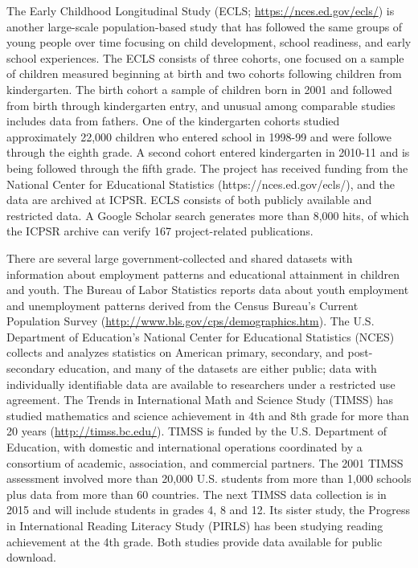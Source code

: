 \documentclass[letterpaper,man,apacite]{apa6}
\begin{document}
The Early Childhood Longitudinal Study (ECLS; \url{https://nces.ed.gov/ecls/}) is another large-scale population-based study that has followed the same groups of young people over time focusing on child development, school readiness, and early school experiences. 
The ECLS consists of three cohorts, one focused on a sample of children measured beginning at birth and two cohorts following children from kindergarten.
The birth cohort a sample of children born in 2001 and followed from birth through kindergarten entry, and unusual among comparable studies includes data from fathers. 
One of the kindergarten cohorts studied approximately 22,000 children who entered school in 1998-99 and were followe through the eighth grade. 
A second cohort entered kindergarten in 2010-11 and is being followed through the fifth grade.
The project has received funding from the National Center for Educational Statistics (https://nces.ed.gov/ecls/), and the data are archived at ICPSR.
ECLS consists of both publicly available and restricted data.
A Google Scholar search generates more than 8,000 hits, of which the ICPSR archive can verify 167 project-related publications.

There are several large government-collected and shared datasets with information about employment patterns and educational attainment in children and youth.
The Bureau of Labor Statistics reports data about youth employment and unemployment patterns derived from the Census Bureau's Current Population Survey (\url{http://www.bls.gov/cps/demographics.htm}).
The U.S. Department of Education's National Center for Educational Statistics (NCES) collects and analyzes statistics on American primary, secondary, and post-secondary education, and many of the datasets are either public; data with individually identifiable data are available to researchers under a restricted use agreement.
The Trends in International Math and Science Study (TIMSS) has studied mathematics and science achievement in 4th and 8th grade for more than 20 years (\url{http://timss.bc.edu/}).
TIMSS is funded by the U.S. Department of Education, with domestic and international operations coordinated by a consortium of academic, association, and commercial partners.
The 2001 TIMSS assessment involved more than 20,000 U.S. students from more than 1,000 schools plus data from more than 60 countries.
The next TIMSS data collection is in 2015 and will include students in grades 4, 8 and 12.
Its sister study, the Progress in International Reading Literacy Study (PIRLS) has been studying reading achievement at the 4th grade.
Both studies provide data available for public download.
\end{document}
